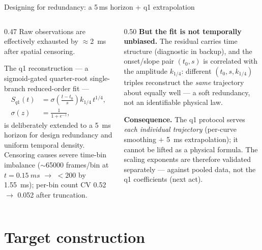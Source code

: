 \documentclass[aspectratio=169,11pt]{beamer}
\newcommand{\good}[1]{\textcolor{goodGreen}{#1}}
\newcommand{\warn}[1]{\textcolor{warnRed}{#1}}
\newcommand{\blue}[1]{\textcolor{aaltoBlue}{#1}}
\begin{document}
\begin{frame}{Designing for redundancy: a 5\,ms horizon + q1 extrapolation}
\small
\begin{columns}[T]
\begin{column}{0.47\linewidth}
Raw observations are effectively exhausted by $\approx$\SI{2}{ms} after spatial censoring.

The q1 reconstruction --- a sigmoid-gated quarter-root single-branch reduced-order fit ---
\[
\begin{aligned}
S_{q1}(t)&=\sigma\!\left(\tfrac{t-t_0}{s}\right)k_{1/4}\,t^{1/4},\\[2pt]
\sigma(z)&=\frac{1}{1+e^{-z}},
\end{aligned}
\]
is deliberately extended to a \blue{\SI{5}{ms}} horizon for design redundancy and uniform temporal density.
\smallskip
Censoring causes severe time-bin imbalance ($\sim$\num{65000} frames/bin at $t=\SI{0.15}{ms}$ $\to$ $<200$ by \SI{1.55}{ms}); per-bin count CV \good{0.52 $\to$ 0.052} after truncation.
\end{column}
\begin{column}{0.50\linewidth}
\textbf{But the fit is not temporally unbiased.} The residual carries time structure (diagnostic in backup), and the onset/slope pair $(t_0,s)$ is \warn{correlated with the amplitude $k_{1/4}$}: different $(t_0,s,k_{1/4})$ triples reconstruct the \emph{same} trajectory about equally well --- a \blue{soft redundancy}, not an identifiable physical law.

\vspace{0.5em}
\textbf{Consequence.} The q1 protocol serves \emph{each individual trajectory} (per-curve smoothing $+$ \SI{5}{ms} extrapolation); it \warn{cannot be lifted as a physical formula}. The scaling exponents are therefore validated separately --- against pooled data, not the q1 coefficients (next act).
\end{column}
\end{columns}
\end{frame}


\section{Target construction}
\end{document}
